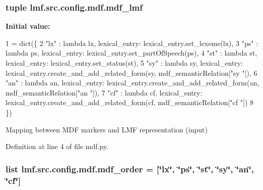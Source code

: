 \hypertarget{namespacelmf_1_1src_1_1config_1_1mdf_a888cd9df8b9511d408e646dc404b5232}{
\subsubsection[{mdf\+\_\+lmf}]{\setlength{\rightskip}{0pt plus 5cm}tuple lmf.\+src.\+config.\+mdf.\+mdf\+\_\+lmf}}\label{namespacelmf_1_1src_1_1config_1_1mdf_a888cd9df8b9511d408e646dc404b5232}
{\bfseries Initial value\+:}
\begin{DoxyCode}
1 = dict(\{
2     \textcolor{stringliteral}{"lx"} : \textcolor{keyword}{lambda} lx, lexical\_entry: lexical\_entry.set\_lexeme(lx),
3     \textcolor{stringliteral}{"ps"} : \textcolor{keyword}{lambda} ps, lexical\_entry: lexical\_entry.set\_partOfSpeech(ps),
4     \textcolor{stringliteral}{"st"} : \textcolor{keyword}{lambda} st, lexical\_entry: lexical\_entry.set\_status(st),
5     \textcolor{stringliteral}{"sy"} : \textcolor{keyword}{lambda} sy, lexical\_entry: lexical\_entry.create\_and\_add\_related\_form(sy, mdf\_semanticRelation[\textcolor{stringliteral}{"sy
      "}]),
6     \textcolor{stringliteral}{"an"} : \textcolor{keyword}{lambda} an, lexical\_entry: lexical\_entry.create\_and\_add\_related\_form(an, mdf\_semanticRelation[\textcolor{stringliteral}{"an
      "}]),
7     \textcolor{stringliteral}{"cf"} : \textcolor{keyword}{lambda} cf, lexical\_entry: lexical\_entry.create\_and\_add\_related\_form(cf, mdf\_semanticRelation[\textcolor{stringliteral}{"cf
      "}])
8 \})
\end{DoxyCode}


Mapping between M\+D\+F markers and L\+M\+F representation (input) 



Definition at line 4 of file mdf.\+py.

\hypertarget{namespacelmf_1_1src_1_1config_1_1mdf_afe5efb72442beb65b5083335b744845c}{
\subsubsection[{mdf\+\_\+order}]{\setlength{\rightskip}{0pt plus 5cm}list lmf.\+src.\+config.\+mdf.\+mdf\+\_\+order = \mbox{[}\char`\"{}lx\char`\"{}, \char`\"{}ps\char`\"{}, \char`\"{}st\char`\"{}, \char`\"{}sy\char`\"{}, \char`\"{}an\char`\"{}, \char`\"{}cf\char`\"{}\mbox{]}}}\label{namespacelmf_1_1src_1_1config_1_1mdf_afe5efb72442beb65b5083335b744845c}


